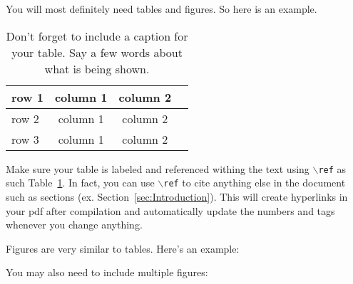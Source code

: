 \documentclass[11pt]{amsart}
\begin{document}
You will most definitely need tables and figures. So here is an example. 

\begin{table}[htp]
    \centering
    \begin{tabular}{| l | c|c | r |}
         \hline
         row 1 & column 1  & column 2  \\ \hline
         row 2 & column 1 & column 2 \\ 
         row 3 & column 1 & column 2 \\ \hline
    \end{tabular}
    \caption{Don't forget to include a caption for your table. Say a few words about what is 
    being shown.}
    \label{tab:meaningful-label}
\end{table}

Make sure your table is labeled and referenced withing the text using $\backslash$\texttt{ref} as such Table~\ref{tab:meaningful-label}. In fact, you can 
use $\backslash$\texttt{ref} to cite anything else in the document such as 
sections (ex. Section~\ref{sec:Introduction}). This will create hyperlinks in your 
pdf after compilation and automatically update the numbers and tags whenever you change 
anything. 

Figures are very similar to tables. Here's an example: 


You may also need to include multiple figures: 

\end{document}

